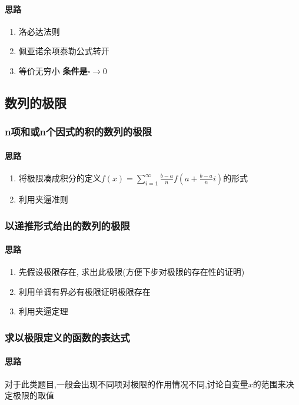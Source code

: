     \paragraph{思路}
    \begin{enumerate}
        \item 洛必达法则
        \item 佩亚诺余项泰勒公式转开
        \item 等价无穷小 \textbf{条件是$\square \rightarrow 0$}
    \end{enumerate}
\subsection{数列的极限}
    \subsubsection{n项和或n个因式的积的数列的极限}
        \paragraph{思路}
            \begin{enumerate}
                \item 将极限凑成积分的定义$f(x) = \sum\limits_{i=1}^{\infty}\frac{b-a}{n}f(a + \frac{b-a}{n}i)$的形式
                \item 利用夹逼准则
            \end{enumerate}
    \subsubsection{以递推形式给出的数列的极限}
        \paragraph{思路}
            \begin{enumerate}
                \item 先假设极限存在, 求出此极限(方便下步对极限的存在性的证明)
                \item 利用单调有界必有极限证明极限存在
                \item 利用夹逼定理
            \end{enumerate}
    \subsubsection{求以极限定义的函数的表达式}
        \paragraph{思路}
            对于此类题目,一般会出现不同项对极限的作用情况不同,讨论自变量$x$的范围来决定极限的取值
